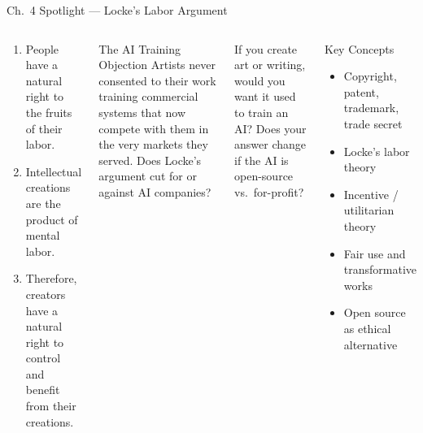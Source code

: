 \documentclass[aspectratio=169,10pt]{beamer}
\begin{document}
\begin{frame}[shrink=5]{Ch.~4 Spotlight --- Locke's Labor Argument}
\begin{columns}[c]
\begin{argumentbox}
\footnotesize
\begin{enumerate}
  \item People have a natural right to the fruits of their labor.
  \item Intellectual creations are the product of mental labor.
  \item Therefore, creators have a natural right to control and benefit from their creations.
\end{enumerate}
\end{argumentbox}
\vspace{0.2em}
\begin{alertblock}{The AI Training Objection}
\footnotesize Artists never consented to their work training commercial systems that now compete with them in the very markets they served. Does Locke's argument cut for or against AI companies?
\end{alertblock}
\vspace{0.2em}
\begin{discussionbox}
\footnotesize If you create art or writing, would you want it used to train an AI? Does your answer change if the AI is open-source vs.\ for-profit?
\end{discussionbox}
\begin{block}{Key Concepts}
\footnotesize
\begin{itemize}
  \item Copyright, patent, trademark, trade secret
  \item Locke's labor theory
  \item Incentive / utilitarian theory
  \item Fair use and transformative works
  \item Open source as ethical alternative
\end{itemize}
\end{block}
\end{columns}
\end{frame}
\end{document}
